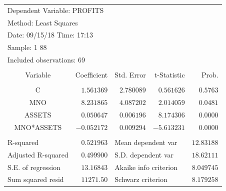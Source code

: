 \documentclass[12pt]{report}
\begin{document}
\begin{table}[!htbp]
	\centering
	\begin{tabular}{lrrrr}
		\multicolumn{3}{l}{Dependent Variable: PROFITS}&\multicolumn{1}{c}{}&\multicolumn{1}{c}{}\\
		\multicolumn{3}{l}{Method: Least Squares}&\multicolumn{1}{c}{}&\multicolumn{1}{c}{}\\
		\multicolumn{3}{l}{Date: 09/15/18   Time: 17:13}&\multicolumn{1}{c}{}&\multicolumn{1}{c}{}\\
		\multicolumn{2}{l}{Sample: 1 88}&\multicolumn{1}{c}{}&\multicolumn{1}{c}{}&\multicolumn{1}{c}{}\\
		\multicolumn{3}{l}{Included observations: 69}&\multicolumn{1}{c}{}&\multicolumn{1}{c}{}\\
		[4.5pt] \hline \\ [-4.5pt]
		\multicolumn{1}{c}{Variable}&\multicolumn{1}{r}{Coefficient}&\multicolumn{1}{r}{Std. Error}&\multicolumn{1}{r}{t-Statistic}&\multicolumn{1}{r}{Prob.}\\
		[4.5pt] \hline \\ [-4.5pt]
		\multicolumn{1}{c}{C}&\multicolumn{1}{r}{$1.561369$}&\multicolumn{1}{r}{$2.780089$}&\multicolumn{1}{r}{$0.561626$}&\multicolumn{1}{r}{$0.5763$}\\
		\multicolumn{1}{c}{MNO}&\multicolumn{1}{r}{$8.231865$}&\multicolumn{1}{r}{$4.087202$}&\multicolumn{1}{r}{$2.014059$}&\multicolumn{1}{r}{$0.0481$}\\
		\multicolumn{1}{c}{ASSETS}&\multicolumn{1}{r}{$0.050647$}&\multicolumn{1}{r}{$0.006196$}&\multicolumn{1}{r}{$8.174306$}&\multicolumn{1}{r}{$0.0000$}\\
		\multicolumn{1}{c}{MNO*ASSETS}&\multicolumn{1}{r}{$-0.052172$}&\multicolumn{1}{r}{$0.009294$}&\multicolumn{1}{r}{$-5.613231$}&\multicolumn{1}{r}{$0.0000$}\\
		[4.5pt] \hline \\ [-4.5pt]
		\multicolumn{1}{l}{R-squared}&\multicolumn{1}{r}{$0.521963$}&\multicolumn{2}{l}{Mean dependent var}&\multicolumn{1}{r}{$12.83188$}\\
		\multicolumn{1}{l}{Adjusted R-squared}&\multicolumn{1}{r}{$0.499900$}&\multicolumn{2}{l}{S.D. dependent var}&\multicolumn{1}{r}{$18.62111$}\\
		\multicolumn{1}{l}{S.E. of regression}&\multicolumn{1}{r}{$13.16843$}&\multicolumn{2}{l}{Akaike info criterion}&\multicolumn{1}{r}{$8.049745$}\\
		\multicolumn{1}{l}{Sum squared resid}&\multicolumn{1}{r}{$11271.50$}&\multicolumn{2}{l}{Schwarz criterion}&\multicolumn{1}{r}{$8.179258$}\\

\end{tabular}
\end{table}
\end{document}
